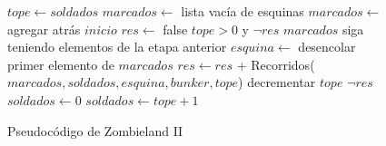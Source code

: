 \begin{figure}[!ht]
\begin{codebox}
\li $tope \leftarrow soldados$
\li $marcados \leftarrow$ lista vacía de esquinas
\li $marcados \leftarrow$ agregar atrás $inicio$
\li $res \leftarrow$ false
\li \While $tope > 0$ y $\neg res$
\li		\Do \While $marcados$ siga teniendo elementos de la etapa anterior
\li				\Do
					$esquina \leftarrow$ desencolar primer elemento de $marcados$
\li					$res \leftarrow res$ + {\sc Recorridos}($marcados,soldados,esquina,bunker,tope$)
				\End
\li			decrementar $tope$
		\End
\li	\If $\neg res$
\li		\Do $soldados \leftarrow 0$ \End
\li		\Else 
\li			\Do $soldados \leftarrow tope + 1$
			\End
		\End
\end{codebox} 
\caption{Pseudocódigo de Zombieland II}\label{code:zombieland}
\end{figure}


